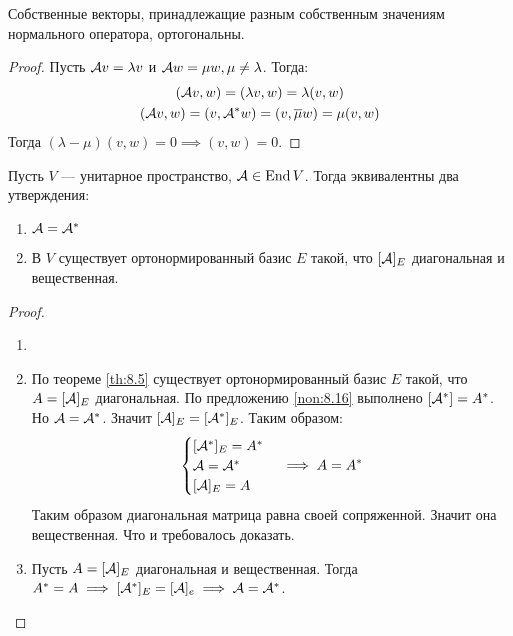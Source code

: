 \documentclass[../main.tex]{subfiles}
\begin{document}
\begin{theorem-non}
  Собственные векторы, принадлежащие разным собственным значениям нормального оператора, ортогональны.
\end{theorem-non}
\begin{proof}
  Пусть $\mathcal{A} v = \lambda v$ и $\mathcal{A} w = \mu w, \mu \neq \lambda$. Тогда:
  \begin{equation*}
    \begin{gathered}
      (\mathcal{A} v, w) = (\lambda v, w) = \lambda (v, w) \\
      (\mathcal{A} v, w) = (v, \mathcal{A}^{*} w) = (v, \overline{\mu} w) = \mu (v, w)
    \end{gathered}
  \end{equation*}
  Тогда $(\lambda - \mu)(v, w) = 0 \implies (v, w) = 0$.
\end{proof}

\begin{corollary}
  Пусть $V$ --- унитарное пространство, $\mathcal{A} \in \operatorname{End} V$. Тогда эквивалентны два утверждения:
  \begin{enumerate}
    \item $\mathcal{A} = \mathcal{A}^{*}$
    \item В $V$ существует ортонормированный базис $E$ такой, что $[\mathcal{A}]_E$ диагональная и вещественная.
  \end{enumerate}
\end{corollary}
\pagebreak
\begin{proof}
  \begin{enumerate}
    \item[]
    \item[] 
    По теореме \ref{th:8.5} существует ортонормированный базис $E$ такой, что $A = [\mathcal{A}]_E$ диагональная. По предложению \ref{non:8.16} выполнено $[\mathcal{A}^{*}] = A^{*}$. Но $\mathcal{A} = \mathcal{A}^{*}$. Значит $[\mathcal{A}]_E = [\mathcal{A}^{*}]_E$. Таким образом:
    \begin{equation*}
      \begin{cases}
        [\A^{*}]_E = A^{*} \\
        \A = \A^{*} \\
        [\A]_E = A
      \end{cases} \implies
      A = A^{*}
    \end{equation*}
    Таким образом диагональная матрица равна своей сопряженной. Значит она вещественная. Что и требовалось доказать.

    \item[] 
    Пусть $A = [\mathcal{A}]_E$ диагональная и вещественная. Тогда $A^{*} = A \implies [\mathcal{A}^{*}]_E = [\mathcal{A}]_e \implies \mathcal{A} = \mathcal{A}^{*}$.
  \end{enumerate}
\end{proof}
\end{document}
